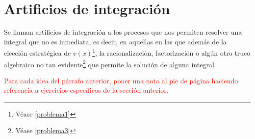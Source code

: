 \section{Artificios de integración}\label{sec4}
Se llaman artificios de integración a los procesos que nos permiten resolver una integral que no es inmediata, es decir, en aquellas en las que además de la elección estratégica de $v(x)$\footnote{Véase \cref{problema1}}, la racionalización, factorización o algún otro truco algebraico no tan evidente\footnote{Véase \cref{problema3}} que permite la solución de alguna integral.

\textcolor{red}{Para cada idea del párrafo anterior, poner una nota al pie de página haciendo referencia a ejercicios específicos de la sección anterior.}












